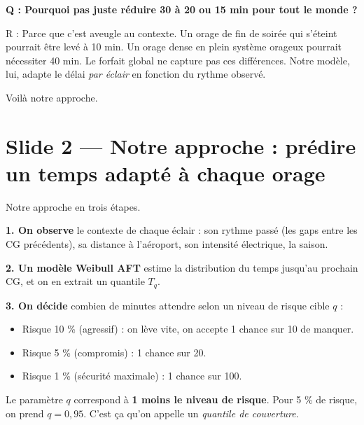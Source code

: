 \documentclass[11pt,a4paper]{article}
\begin{document}
\begin{piege}
\textbf{Q : Pourquoi pas juste réduire 30 à 20 ou 15 min pour tout le monde ?}

R : Parce que c'est aveugle au contexte. Un orage de fin de soirée qui s'éteint pourrait
être levé à 10 min. Un orage dense en plein système orageux pourrait nécessiter 40 min.
Le forfait global ne capture pas ces différences. Notre modèle, lui, adapte le délai
\emph{par éclair} en fonction du rythme observé.
\end{piege}

\begin{transit}
\og Voilà notre approche. \fg{}
\end{transit}

\section{Slide 2 — Notre approche : prédire un temps adapté à chaque orage}

\begin{dire}
\og Notre approche en trois étapes.

\textbf{1. On observe} le contexte de chaque éclair : son rythme passé (les gaps entre
les CG précédents), sa distance à l'aéroport, son intensité électrique, la saison.

\textbf{2. Un modèle Weibull AFT} estime la distribution du temps jusqu'au prochain CG,
et on en extrait un quantile $T_q$.

\textbf{3. On décide} combien de minutes attendre selon un niveau de risque cible $q$ :
\begin{itemize}[topsep=2pt]
    \item Risque 10 \% (agressif) : on lève vite, on accepte 1 chance sur 10 de manquer.
    \item Risque 5 \% (compromis) : 1 chance sur 20.
    \item Risque 1 \% (sécurité maximale) : 1 chance sur 100.
\end{itemize}

Le paramètre $q$ correspond à \textbf{1 moins le niveau de risque}. Pour 5 \% de risque,
on prend $q = 0{,}95$. C'est ça qu'on appelle un \emph{quantile de couverture}. \fg{}
\end{dire}
\end{document}
